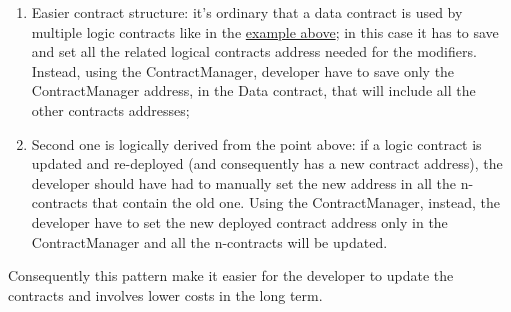 \begin{enumerate}
	\item Easier contract structure: it's ordinary that a data contract is used by multiple logic contracts like in the \hyperref[DataLogic]{example above}; in this case it has to save and set all the related logical contracts address needed for the modifiers. Instead, using the ContractManager, developer have to save only the ContractManager address, in the Data contract, that will include all the other contracts addresses;
	\item Second one is logically derived from the point above: if a logic contract is updated and re-deployed (and consequently has a new contract address), the developer should have had to manually set the new address in all the n-contracts that contain the old one. Using the ContractManager, instead, the developer have to set the new deployed contract address only in the ContractManager and all the n-contracts will be updated.
\end{enumerate}
Consequently this pattern make it easier for the developer to update the contracts and involves lower costs in the long term.
\newpage
